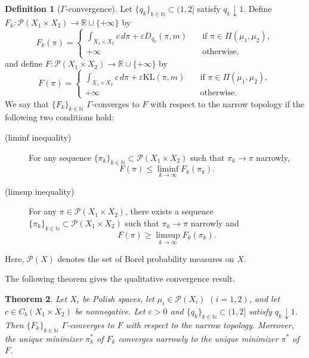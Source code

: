\documentclass[a4paper,11pt]{article}
\theoremstyle{plain}
\newtheorem{thm}{Theorem}[section]
\theoremstyle{definition}
\newtheorem{dfn}[thm]{Definition}
\theoremstyle{remark}
\theoremstyle{plain}
\numberwithin{equation}{section}
\newcommand{\R}{\mathbb R}
\newcommand{\N}{\mathbb N}
\newcommand{\ep}{\varepsilon}
\newcommand{\1}{\mbox{1}\hspace{-0.25em}\mbox{l}} %
\begin{document}
\begin{dfn}[$\Gamma$-convergence]\label{Gamma-convergence}
Let $\{q_k\}_{k\in\N}\subset(1,2]$ satisfy $q_k\downarrow1$. Define $F_k:\mathcal P(X_1\times X_2)\to\R\cup\{+\infty\}$ by
\begin{equation*}
F_k(\pi) = 
\begin{cases} 
\displaystyle \int_{X_1 \times X_2} c\, d\pi + \ep D_{q_k}(\pi, m) \quad &\text{if} \,\, \pi \in \Pi(\mu_1, \mu_2), \\
+\infty &\text{otherwise}, 
\end{cases}
\end{equation*}
and define $F:\mathcal P(X_1\times X_2)\to\R\cup\{+\infty\}$ by
\begin{equation*}
F(\pi) = 
\begin{cases} 
\displaystyle \int_{X_1 \times X_2} c\, d\pi + \ep \mathrm{KL}(\pi, m)\quad &\text{if} \,\, \pi \in \Pi(\mu_1, \mu_2), \\
+\infty &\text{otherwise}. 
\end{cases}
\end{equation*}
We say that $\{F_k\}_{k\in\N}$ $\Gamma$-converges to $F$ with respect to the narrow topology if the following two conditions hold:
\begin{description}
\item[(liminf inequality)] For any sequence $\{\pi_k\}_{k\in\N}\subset\mathcal P(X_1\times X_2)$ such that $\pi_k\to\pi$ narrowly,
\begin{equation*}
F(\pi) \leq \liminf_{k \to \infty} F_k(\pi_k).
\end{equation*}

\item[(limsup inequality)] For any $\pi\in\mathcal P(X_1\times X_2)$, there exists a sequence $\{\pi_k\}_{k\in\N}\subset\mathcal P(X_1\times X_2)$ such that $\pi_k\to\pi$ narrowly and
\begin{equation*}
F(\pi) \geq \limsup_{k \to \infty} F_k(\pi_k).
\end{equation*}
\end{description}
Here, $\mathcal P(X)$ denotes the set of Borel probability measures on $X$. 
\end{dfn}
The following theorem gives the qualitative convergence result.
\begin{thm}\label{thm;narrow}
Let $X_i$ be Polish spaces, let $\mu_i\in\mathcal P(X_i)$ $(i=1,2)$, and let $c\in C_b(X_1\times X_2)$ be nonnegative. Let $\ep>0$ and $\{q_k\}_{k\in\N}\subset(1,2]$ satisfy $q_k\downarrow1$. Then $\{F_k\}_{k\in\N}$ $\Gamma$-converges to $F$ with respect to the narrow topology. Moreover, the unique minimizer $\pi_k^*$ of $F_k$ converges narrowly to the unique minimizer $\pi^*$ of $F$.
\end{thm}
\end{document}

